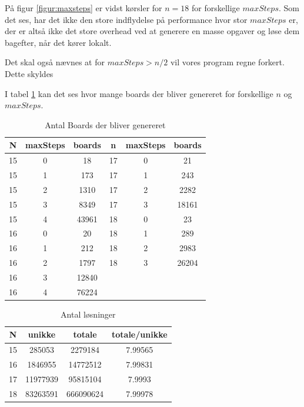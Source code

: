 På figur \ref{figur:maxsteps} er vidst kørsler for $n=18$ for forskellige
$maxSteps$. 
Som det ses, har det ikke den store indflydelse på performance hvor stor
$maxSteps$ er, der er altså ikke det store overhead ved at generere en masse
opgaver og løse dem bagefter, når det kører lokalt. 

Det skal også nævnes at for $maxSteps>n/2$ vil vores program regne forkert.
Dette skyldes 


I tabel \ref{tabel:noboards} kan det ses hvor mange boards der bliver genereret
for forskellige $n$ og $maxSteps$. 

\begin{table}
	\begin{center}
		\begin{tabular}{|c|c|c|c|c|c|}
			\hline N  & maxSteps  & boards & n  & maxSteps & boards \\
			\hline 15 & 0         & 18     & 17 & 0        & 21     \\
			\hline 15 & 1         & 173    & 17 & 1        & 243    \\
			\hline 15 & 2         & 1310   & 17 & 2        & 2282   \\ 
			\hline 15 & 3         & 8349   & 17 & 3        & 18161  \\
			\hline 15 & 4         & 43961  & 18 & 0        & 23     \\
			\hline 16 & 0         & 20     & 18 & 1        & 289    \\
			\hline 16 & 1         & 212    & 18 & 2        & 2983   \\
			\hline 16 & 2         & 1797   & 18 & 3        & 26204  \\
			\hline 16 & 3         & 12840  &    &          &        \\
			\hline 16 & 4         & 76224  &    &          &        \\
			\hline
		\end{tabular}
		\caption{Antal Boards der bliver genereret}
		\label{tabel:noboards}
	\end{center}
\end{table}

\begin{table}
	\begin{center}
		\begin{tabular}{|c|c|c|c|}
			\hline N & unikke & totale & totale/unikke \\
			\hline 15 & 285053 & 2279184 & 7.99565 \\
			\hline 16 & 1846955 & 14772512 & 7.99831 \\
			\hline 17 & 11977939 & 95815104  & 7.9993 \\
			\hline 18 & 83263591 & 666090624 & 7.99978 \\
			\hline
		\end{tabular}
		\caption{Antal løsninger}
		\label{tabel:unikkevstotale}
	\end{center}
\end{table}

